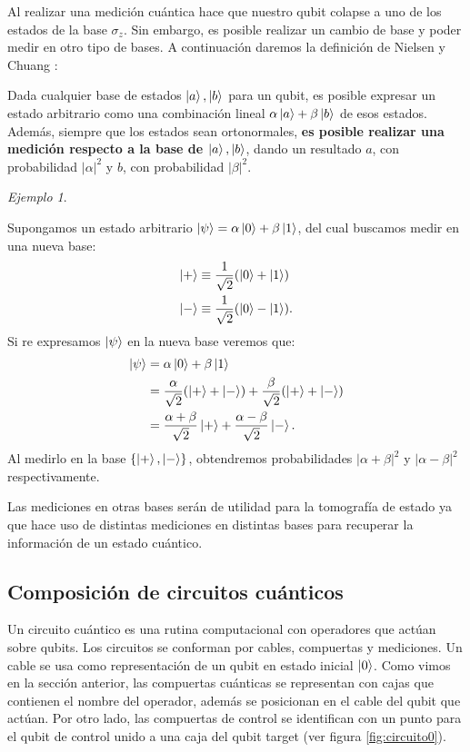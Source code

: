 \documentclass[letterpaper,12pt]{thesisECFM}
\theoremstyle{plain}
\theoremstyle{definition}
\theoremstyle{definition}
\theoremstyle{remark}
\newcommand{\1}{\mathbb{1}}
\newtheorem{ex}{Ejemplo}[section]
\begin{document}
Al realizar una medición cuántica hace que nuestro qubit colapse a uno de los estados de la base $ \sigma_z$. Sin embargo, es posible realizar un cambio de base y poder medir en otro tipo de bases. A continuación daremos la definición de Nielsen y Chuang \cite{nielsen_chuang_2011}:

Dada cualquier base de estados $\ket{a},\ket{b}$ para un qubit, es posible expresar un estado arbitrario como una combinación lineal $\alpha\ket{a}+\beta\ket{b}$ de esos estados. Además, siempre que los estados sean ortonormales,  \textbf{es posible realizar una medición respecto a la base de $\ket{a},\ket{b}$}, dando un resultado $a$, con probabilidad $|\alpha|^2$ y $b$, con probabilidad $|\beta|^2$. 

\begin{ex}\label{Ejemplo 2.1.1} \end{ex}
 Supongamos un estado arbitrario $\ket{\psi}=\alpha \ket{0} + \beta\ket{1}$, del cual buscamos medir en una nueva base:
 \begin{align}
 \label{ec:2.32}
     \ket{+} & \equiv \frac{1}{\sqrt{2}} (\ket{0} + \ket{1}) \\
    \ket{-} & \equiv \frac{1}{\sqrt{2}} (\ket{0}-\ket{1}).
 \end{align}
Si re expresamos $\ket{\psi}$ en la nueva base veremos que:
 \begin{align}
     \ket{\psi}  &= \alpha\ket{0} + \beta\ket{1} \\
                 &= \frac{\alpha}{\sqrt{2}} ( \ket{+ } + \ket{-}) + \frac{\beta}{\sqrt{2}} (\ket{+} + \ket{-})\\
                 & = \frac{\alpha+\beta}{\sqrt{2}} \ket{+} + \frac{\alpha-\beta}{\sqrt{2}} \ket{-} . 
 \end{align}
Al medirlo en la base $\{\ket{+}, \ket{-}\}$, obtendremos probabilidades $|\alpha+\beta|^2$ y $|\alpha-\beta|^2$ respectivamente.

Las mediciones en otras bases serán de utilidad para la tomografía de estado ya que hace uso de distintas mediciones en distintas bases para recuperar la información de un estado cuántico.
\subsection{Composición de circuitos cuánticos} %

Un circuito cuántico es una rutina computacional con operadores que actúan
sobre qubits. Los circuitos se conforman por cables, compuertas y mediciones.
Un cable se usa como representación de un qubit en estado inicial $\ket{0}$.  
Como vimos en la sección anterior, las compuertas cuánticas se representan con
cajas que contienen el nombre del operador, además se posicionan en el cable del qubit que actúan. Por otro lado, las compuertas de
control se identifican con un punto para el qubit de control unido a una caja
del qubit target (ver figura \ref{fig:circuito0}).
\end{document}

